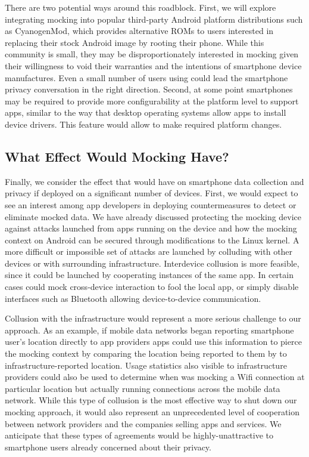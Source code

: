 There are two potential ways around this roadblock. First, we will explore
integrating mocking into popular third-party Android platform distributions
such as CyanogenMod, which provides alternative ROMs to users interested in
replacing their stock Android image by rooting their phone. While this
community is small, they may be disproportionately interested in mocking
given their willingness to void their warranties and the intentions of
smartphone device manufactures. Even a small number of users using
\PocketMocker{} could lead the smartphone privacy conversation in the right
direction. Second, at some point smartphones may be required to provide more
configurability at the platform level to support apps, similar to the way
that desktop operating systems allow apps to install device drivers. This
feature would allow \PocketMocker{} to make required platform changes.

\subsection{What Effect Would Mocking Have?}

Finally, we consider the effect that \PocketMocker{} would have on smartphone
data collection and privacy if deployed on a significant number of devices.
First, we would expect to see an interest among app developers in deploying
countermeasures to detect or eliminate mocked data. We have already discussed
protecting the mocking device against attacks launched from apps running on
the device and how the mocking context on Android can be secured through
modifications to the Linux kernel. A more difficult or impossible set of
attacks are launched by colluding with other devices or with surrounding
infrastructure. Interdevice collusion is more feasible, since it could be
launched by cooperating instances of the same app. In certain cases
\PocketMocker{} could mock cross-device interaction to fool the local app, or
simply disable interfaces such as Bluetooth allowing device-to-device
communication.

Collusion with the infrastructure would represent a more serious challenge to
our approach. As an example, if mobile data networks began reporting
smartphone user's location directly to app providers apps could use this
information to pierce the mocking context by comparing the location being
reported to them by \PocketMocker{} to infrastructure-reported location.
Usage statistics also visible to infrastructure providers could also be used
to determine when \PocketMocker{} was mocking a Wifi connection at particular
location but actually running connections across the mobile data network.
While this type of collusion is the most effective way to shut down our
mocking approach, it would also represent an unprecedented level of cooperation
between network providers and the companies selling apps and services. We
anticipate that these types of agreements would be highly-unattractive to
smartphone users already concerned about their privacy.

